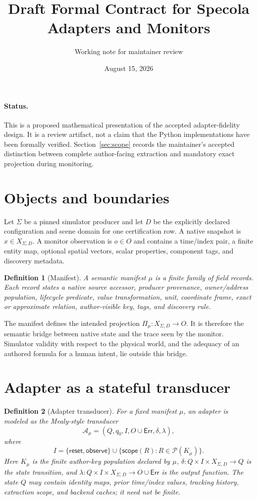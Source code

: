 \documentclass[11pt]{article}
\title{Draft Formal Contract for Specola Adapters and Monitors}
\author{Working note for maintainer review}
\date{August 15, 2026}
\newcommand{\powerset}{\mathcal{P}}
\newcommand{\Err}{\mathsf{Err}}
\newcommand{\SpReset}{\mathsf{reset}}
\newcommand{\SpObserve}{\mathsf{observe}}
\newcommand{\SpScope}{\mathsf{scope}}
\newtheorem{definition}{Definition}
\begin{document}
\maketitle

\paragraph{Status.}
This is a proposed mathematical presentation of the accepted adapter-fidelity
design.  It is a review artifact, not a claim that the Python implementations
have been formally verified.  Section~\ref{sec:scope} records the maintainer's
accepted distinction between complete author-facing extraction and mandatory
exact projection during monitoring.

\section{Objects and boundaries}

Let $\Sigma$ be a pinned simulator producer and let $D$ be the explicitly
declared configuration and scene domain for one certification row.  A native
snapshot is $x\in X_{\Sigma,D}$.  A monitor observation is $o\in O$ and
contains a time/index pair, a finite entity map, optional spatial vectors,
scalar properties, component tags, and discovery metadata.

\begin{definition}[Manifest]
A semantic manifest $\mu$ is a finite family of field records.  Each record
states a native source accessor, producer provenance, owner/address
population, lifecycle predicate, value transformation, unit, coordinate
frame, exact or approximate relation, author-visible key, tags, and discovery
rule.
\end{definition}

The manifest defines the intended projection $\Pi_\mu:X_{\Sigma,D}\to O$.
It is therefore the semantic bridge between native state and the trace seen by
the monitor.  Simulator validity with respect to the physical world, and the
adequacy of an authored formula for a human intent, lie outside this bridge.

\section{Adapter as a stateful transducer}

\begin{definition}[Adapter transducer]
For a fixed manifest $\mu$, an adapter is modeled as the Mealy-style
transducer
\[
  \mathcal{A}_\mu=(Q,q_0,I,O\cup\Err,\delta,\lambda),
\]
where
\[
  I = \{\SpReset,\SpObserve\}\cup
      \{\SpScope(R):R\in\powerset(K_\mu)\}.
\]
Here $K_\mu$ is the finite author-key population declared by $\mu$,
$\delta:Q\times I\times X_{\Sigma,D}\to Q$ is the state transition, and
$\lambda:Q\times I\times X_{\Sigma,D}\to O\cup\Err$ is the output
function.  The state $Q$ may contain identity maps, prior time/index values,
tracking history, extraction scope, and backend caches; it need not be finite.
\end{definition}
\end{document}
